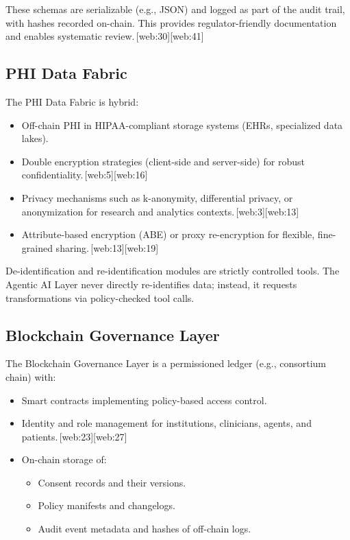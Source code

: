 \documentclass[11pt]{article}
\begin{document}
These schemas are serializable (e.g., JSON) and logged as part of the audit trail, with hashes recorded on-chain. 
This provides regulator-friendly documentation and enables systematic review.\,[web:30][web:41]

\subsection{PHI Data Fabric}

The PHI Data Fabric is hybrid:
\begin{itemize}[nosep]
  \item Off-chain PHI in HIPAA-compliant storage systems (EHRs, specialized data lakes).
  \item Double encryption strategies (client-side and server-side) for robust confidentiality.\,[web:5][web:16]
  \item Privacy mechanisms such as k-anonymity, differential privacy, or anonymization for research and analytics contexts.\,[web:3][web:13]
  \item Attribute-based encryption (ABE) or proxy re-encryption for flexible, fine-grained sharing.\,[web:13][web:19]
\end{itemize}

De-identification and re-identification modules are strictly controlled tools. 
The Agentic AI Layer never directly re-identifies data; instead, it requests transformations via policy-checked tool calls.

\subsection{Blockchain Governance Layer}

The Blockchain Governance Layer is a permissioned ledger (e.g., consortium chain) with:
\begin{itemize}[nosep]
  \item Smart contracts implementing policy-based access control.
  \item Identity and role management for institutions, clinicians, agents, and patients.\,[web:23][web:27]
  \item On-chain storage of:
    \begin{itemize}[nosep]
      \item Consent records and their versions.
      \item Policy manifests and changelogs.
      \item Audit event metadata and hashes of off-chain logs.
    \end{itemize}
\end{itemize}
\end{document}
